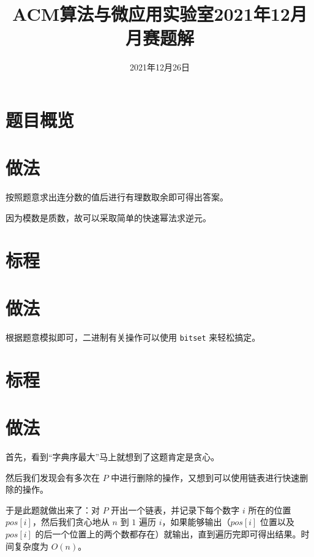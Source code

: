 \documentclass{../cpct/ctsol}
\title{ACM算法与微应用实验室2021年12月月赛题解}
\date{2021年12月26日}
\begin{document}
\maketitle
{}

\section*{题目概览}
\solutiontab

\makesolution
\section*{做法}

按照题意求出连分数的值后进行有理数取余即可得出答案。

因为模数是质数，故可以采取简单的快速幂法求逆元。

\section*{标程}

\makesolution
\section*{做法}

根据题意模拟即可，二进制有关操作可以使用 \verb|bitset| 来轻松搞定。

\section*{标程}

\makesolution
\section*{做法}

首先，看到“字典序最大”马上就想到了这题肯定是贪心。

然后我们发现会有多次在 $P$ 中进行删除的操作，又想到可以使用链表进行快速删除的操作。

于是此题就做出来了：对 $P$ 开出一个链表，并记录下每个数字 $i$ 所在的位置 $pos[i]$，然后我们贪心地从 $n$ 到 $1$ 遍历 $i$，如果能够输出（$pos[i]$ 位置以及 $pos[i]$ 的后一个位置上的两个数都存在）就输出，直到遍历完即可得出结果。时间复杂度为 $O(n)$。
\end{document}
